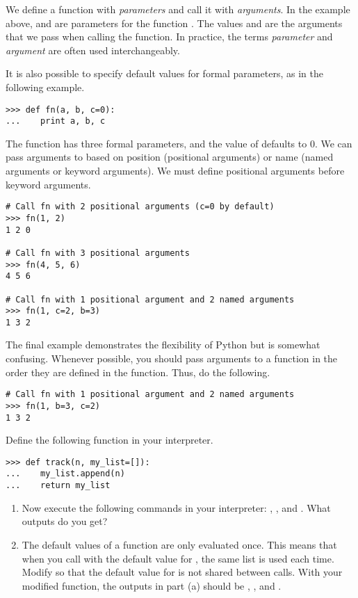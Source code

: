 We define a function with \emph{parameters} and call it with \emph{arguments}.
In the example above,  and  are parameters for the function . The values  and  are the arguments that we pass when calling the function. In practice, the terms \emph{parameter} and \emph{argument} are often used interchangeably.

It is also possible to specify default values for formal parameters, as in the following example.
\begin{lstlisting}
>>> def fn(a, b, c=0):
...    print a, b, c
\end{lstlisting}
The function  has three formal parameters, and the value of  defaults to 0.
We can pass arguments to  based on position (positional arguments) or name (named arguments or keyword arguments). We must define positional arguments before keyword arguments.
\begin{lstlisting}
# Call fn with 2 positional arguments (c=0 by default)
>>> fn(1, 2)
1 2 0

# Call fn with 3 positional arguments
>>> fn(4, 5, 6)
4 5 6

# Call fn with 1 positional argument and 2 named arguments
>>> fn(1, c=2, b=3)
1 3 2
\end{lstlisting}
The final example demonstrates the flexibility of Python but is somewhat confusing. Whenever possible, you should pass arguments to a function in the order they are defined in the function. Thus, do the following.
\begin{lstlisting}
# Call fn with 1 positional argument and 2 named arguments
>>> fn(1, b=3, c=2)
1 3 2
\end{lstlisting}



\begin{problem}
Define the following function in your interpreter.
\begin{lstlisting}
>>> def track(n, my_list=[]):
...    my_list.append(n)
...    return my_list
\end{lstlisting}
\begin{enumerate}
\item Now execute the following commands in your interpreter: , , and . What outputs do you get?
\item The default values of a function are only evaluated once.
This means that when you call  with the default value for , the same list is used each time.
Modify  so that the default value for  is not shared between calls.
With your modified function, the outputs in part (a) should be \li{[1]}, \li{[2]}, and \li{[3]}.
\end{enumerate}
\end{problem}

